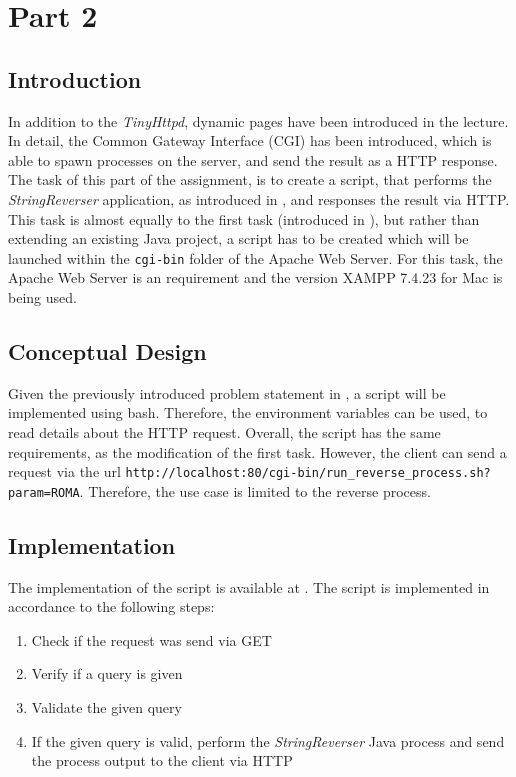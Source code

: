 \section{Part 2}\label{sec:02_part2}

\subsection{Introduction}\label{subsec:02_part2_intro}
In addition to the \textit{TinyHttpd}, dynamic pages have been introduced in the lecture. In detail, the Common Gateway Interface (CGI) has been introduced, which is able to spawn processes on the server, and send the result as a HTTP response.
The task of this part of the assignment, is to create a script, that performs the \textit{StringReverser} application, as introduced in , and responses the result via HTTP. This task is almost equally to the first task (introduced in ), but rather than extending an existing Java project, a script has to be created which will be launched within the \texttt{cgi-bin} folder of the Apache Web Server.
For this task, the Apache Web Server is an requirement and the version XAMPP 7.4.23 for Mac is being used. 

\subsection{Conceptual Design}\label{subsec:02_part2_design}
Given the previously introduced problem statement in , a script will be implemented using bash. Therefore, the environment variables can be used, to read details about the HTTP request.
Overall, the script has the same requirements, as the modification of the first task. However, the client can send a request via the url \texttt{http://localhost:80/cgi-bin/run\_reverse\_process.sh?param=ROMA}. Therefore, the use case is limited to the reverse process.

\subsection{Implementation}\label{subsec:02_part2_impl}
The implementation of the script is available at .
The script is implemented in accordance to the following steps:
\begin{enumerate}
\item Check if the request was send via GET
\item Verify if a query is given
\item Validate the given query
\item If the given query is valid, perform the \textit{StringReverser} Java process and send the process output to the client via HTTP
\end{enumerate}

